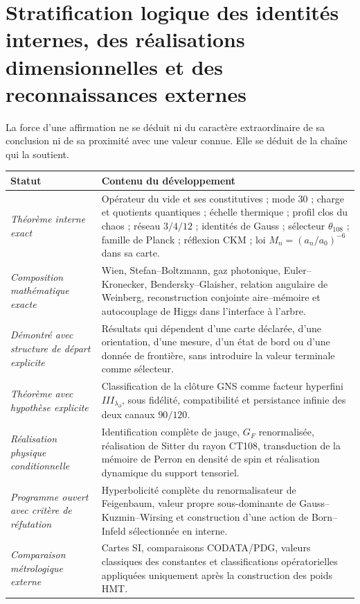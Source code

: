 \section{Stratification logique des identités internes, des réalisations dimensionnelles et des reconnaissances externes}

La force d'une affirmation ne se déduit ni du caractère extraordinaire de sa
conclusion ni de sa proximité avec une valeur connue. Elle se déduit de la chaîne
qui la soutient.

\begin{longtable}{p{36mm}p{96mm}}
\toprule
Statut & Contenu du développement\\
\midrule
\emph{Théorème interne exact}
& Opérateur du vide et ses constitutives ; mode \(30\) ; charge et quotients
quantiques ; échelle thermique ; profil clos du chaos ; réseau
\(3/4/12\) ; identités de Gauss ; sélecteur \(\theta_{108}\) ; famille de
Planck ; réflexion CKM ; loi
\(M_n=(a_n/a_0)^{-6}\) dans sa carte.\\

\emph{Composition mathématique exacte}
& Wien, Stefan--Boltzmann, gaz photonique, Euler--Kronecker,
Bendersky--Glaisher, relation angulaire de Weinberg, reconstruction conjointe
aire--mémoire et autocouplage de Higgs dans l'interface à l'arbre.\\

\emph{Démontré avec structure de départ explicite}
& Résultats qui dépendent d'une carte déclarée, d'une orientation, d'une
mesure, d'un état de bord ou d'une donnée de frontière, sans introduire la valeur
terminale comme sélecteur.\\

\emph{Théorème avec hypothèse explicite}
& Classification de la clôture GNS comme facteur hyperfini
\(III_{\lambda_\partial}\), sous fidélité, compatibilité et persistance
infinie des deux canaux \(90/120\).\\

\emph{Réalisation physique conditionnelle}
& Identification complète de jauge, \(G_F\) renormalisée, réalisation de
Sitter du
rayon CT108, transduction de la mémoire de Perron en densité de spin et
réalisation dynamique du support tensoriel.\\

\emph{Programme ouvert avec critère de réfutation}
& Hyperbolicité complète du renormalisateur de Feigenbaum, valeur propre
sous-dominante de Gauss--Kuzmin--Wirsing et construction d'une action de
Born--Infeld sélectionnée en interne.\\

\emph{Comparaison métrologique externe}
& Cartes SI, comparaisons CODATA/PDG, valeurs classiques des constantes et
classifications opératorielles appliquées uniquement après la construction des poids
HMT.\\
\bottomrule
\end{longtable}

